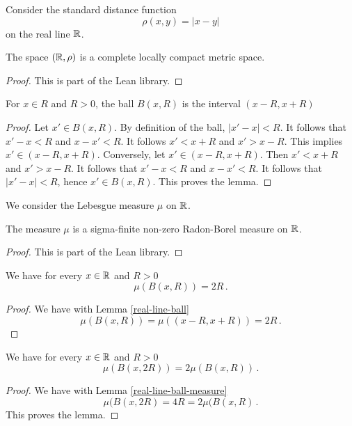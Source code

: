 {Consider the standard distance function
\begin{equation}
    \rho(x,y)=|x-y|
\end{equation}
on the real line ${\mathbb{R}}$.
\begin{lemma}
\label{real-line-metric}
The space $({\mathbb{R}},\rho)$ is a complete locally compact metric space.
\end{lemma}
\begin{proof}
    This is part of the Lean library.
\end{proof}
\begin{lemma}
\label{real-line-ball}
    \leanok
    For $x\in R$ and $R>0$, the ball $B(x,R)$ is the interval $(x-R,x+R)$
\end{lemma}
\begin{proof}
\leanok
Let $x'\in B(x,R)$. By definition of the ball,
$|x'-x|<R$. It follows that $x'-x<R$ and $x-x'<R$.
It follows $x'<x+R$ and $x'>x-R$. This implies
$x'\in (x-R,x+R)$.
Conversely, let $x'\in (x-R,x+R)$. Then
$x'<x+R$ and $x'>x-R$. It follows that
$x'-x<R$ and $x-x'<R$. It follows that $|x'-x|<R$,
hence $x'\in B(x,R)$.
This proves the lemma.
\end{proof}
We consider the Lebesgue measure $\mu$ on ${\mathbb{R}}$.
\begin{lemma}
\label{real-line-measure}
    The measure $\mu$ is a sigma-finite non-zero
    Radon-Borel measure on ${\mathbb{R}}$.
\end{lemma}
\begin{proof}
    This is part of the Lean library.
\end{proof}
\begin{lemma}
\label{real-line-ball-measure}
    \leanok
    We have for every $x\in {\mathbb{R}}$ and $R>0$
    \begin{equation}
        \mu(B(x,R))=2R\, .
    \end{equation}
\end{lemma}
\begin{proof}
\leanok
We have with Lemma \ref{real-line-ball}
\begin{equation}
    \mu(B(x,R))=\mu((x-R,x+R))=2R\, .
\end{equation}
\end{proof}

\begin{lemma}
\label{real-line-doubling}
    We have for every $x\in {\mathbb{R}}$ and $R>0$
    \begin{equation}
        \mu(B(x,2R))=2\mu(B(x,R))\, .
    \end{equation}
\end{lemma}
\begin{proof}
    We have with Lemma \ref{real-line-ball-measure}
\begin{equation}
    \mu(B(x,2R)=4R=2\mu(B(x,R)\, .
\end{equation}
This proves the lemma.
\end{proof}


}
